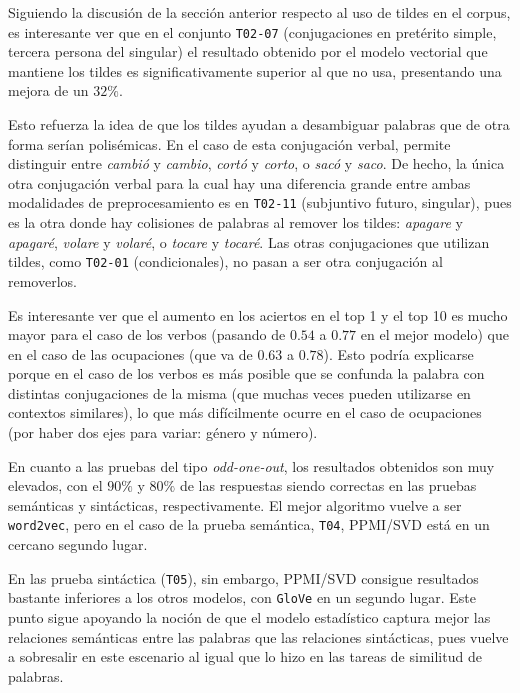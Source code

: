 Siguiendo la discusión de la sección anterior respecto al uso de tildes en el corpus, es interesante
ver que en el conjunto \texttt{T02-07} (conjugaciones en pretérito simple, tercera persona del
singular) el resultado obtenido por el modelo vectorial que mantiene los tildes es
significativamente superior al que no usa, presentando una mejora de un $32\%$.

Esto refuerza la idea de que los tildes ayudan a desambiguar palabras que de otra forma serían
polisémicas. En el caso de esta conjugación verbal, permite distinguir entre \textit{cambió} y
\textit{cambio}, \textit{cortó} y \textit{corto}, o \textit{sacó} y \textit{saco}. De hecho, la
única otra conjugación verbal para la cual hay una diferencia grande entre ambas modalidades de
preprocesamiento es en \texttt{T02-11} (subjuntivo futuro, singular), pues es la otra donde hay
colisiones de palabras al remover los tildes: \textit{apagare} y \textit{apagaré}, \textit{volare} y
\textit{volaré}, o \textit{tocare} y \textit{tocaré}. Las otras conjugaciones que utilizan tildes,
como \texttt{T02-01} (condicionales), no pasan a ser otra conjugación al removerlos.

Es interesante ver que el aumento en los aciertos en el top 1 y el top 10 es mucho mayor para el
caso de los verbos (pasando de $0.54$ a $0.77$ en el mejor modelo) que en el caso de las ocupaciones
(que va de $0.63$ a $0.78$). Esto podría explicarse porque en el caso de los verbos es más posible
que se confunda la palabra con distintas conjugaciones de la misma (que muchas veces pueden
utilizarse en contextos similares), lo que más difícilmente ocurre en el caso de ocupaciones (por
haber dos ejes para variar: género y número).


En cuanto a las pruebas del tipo \textit{odd-one-out}, los resultados obtenidos son muy elevados,
con el $90\%$ y $80\%$ de las respuestas siendo correctas en las pruebas semánticas y sintácticas,
respectivamente. El mejor algoritmo vuelve a ser \texttt{word2vec}, pero en el caso de la prueba
semántica, \texttt{T04}, PPMI/SVD está en un cercano segundo lugar.

En las prueba sintáctica (\texttt{T05}), sin embargo, PPMI/SVD consigue resultados bastante
inferiores a los otros modelos, con \texttt{GloVe} en un segundo lugar. Este punto sigue apoyando la
noción de que el modelo estadístico captura mejor las relaciones semánticas entre las palabras que
las relaciones sintácticas, pues vuelve a sobresalir en este escenario al igual que lo hizo en las
tareas de similitud de palabras.

